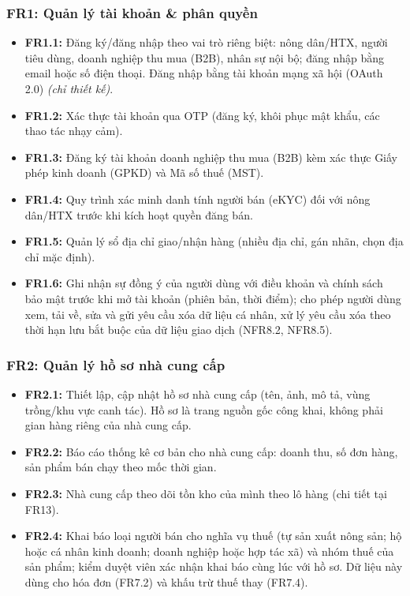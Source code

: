 \subsubsection*{FR1: Quản lý tài khoản \& phân quyền}
\begin{itemize}
    \item \textbf{FR1.1:} Đăng ký/đăng nhập theo vai trò riêng biệt: nông
    dân/HTX, người tiêu dùng, doanh nghiệp thu mua (B2B), nhân sự nội bộ;
    đăng nhập bằng email hoặc số điện thoại. Đăng nhập bằng tài khoản mạng
    xã hội (OAuth 2.0) \emph{(chỉ thiết kế)}.
    \item \textbf{FR1.2:} Xác thực tài khoản qua OTP (đăng ký, khôi phục mật
    khẩu, các thao tác nhạy cảm).
    \item \textbf{FR1.3:} Đăng ký tài khoản doanh nghiệp thu mua (B2B) kèm
    xác thực Giấy phép kinh doanh (GPKD) và Mã số thuế (MST).
    \item \textbf{FR1.4:} Quy trình xác minh danh tính người bán (eKYC) đối
    với nông dân/HTX trước khi kích hoạt quyền đăng bán.
    \item \textbf{FR1.5:} Quản lý sổ địa chỉ giao/nhận hàng (nhiều địa chỉ,
    gán nhãn, chọn địa chỉ mặc định).
    \item \textbf{FR1.6:} Ghi nhận sự đồng ý của người dùng với điều khoản và
    chính sách bảo mật trước khi mở tài khoản (phiên bản, thời điểm); cho
    phép người dùng xem, tải về, sửa và gửi yêu cầu xóa dữ liệu cá nhân, xử
    lý yêu cầu xóa theo thời hạn lưu bắt buộc của dữ liệu giao dịch (NFR8.2,
    NFR8.5).
\end{itemize}

\subsubsection*{FR2: Quản lý hồ sơ nhà cung cấp}
\begin{itemize}
    \item \textbf{FR2.1:} Thiết lập, cập nhật hồ sơ nhà cung cấp (tên, ảnh,
    mô tả, vùng trồng/khu vực canh tác). Hồ sơ là trang nguồn gốc công khai,
    không phải gian hàng riêng của nhà cung cấp.
    \item \textbf{FR2.2:} Báo cáo thống kê cơ bản cho nhà cung cấp: doanh
    thu, số đơn hàng, sản phẩm bán chạy theo mốc thời gian.
    \item \textbf{FR2.3:} Nhà cung cấp theo dõi tồn kho của mình theo lô
    hàng (chi tiết tại FR13).
    \item \textbf{FR2.4:} Khai báo loại người bán cho nghĩa vụ thuế (tự sản
    xuất nông sản; hộ hoặc cá nhân kinh doanh; doanh nghiệp hoặc hợp tác xã)
    và nhóm thuế của sản phẩm; kiểm duyệt viên xác nhận khai báo cùng lúc với
    hồ sơ. Dữ liệu này dùng cho hóa đơn (FR7.2) và khấu trừ thuế thay (FR7.4).
\end{itemize}

